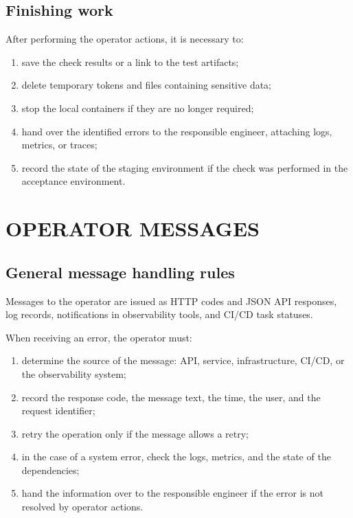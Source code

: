 \documentclass[12pt,a4paper]{extarticle}
\begin{document}
\subsection{Finishing work}

\begin{hseExample}
After performing the operator actions, it is necessary to:

\begin{enumerate}[label=\arabic*), leftmargin=1.25cm]
    \item save the check results or a link to the test artifacts;
    \item delete temporary tokens and files containing sensitive data;
    \item stop the local containers if they are no longer required;
    \item hand over the identified errors to the responsible engineer, attaching logs, metrics, or traces;
    \item record the state of the staging environment if the check was performed in the acceptance environment.
\end{enumerate}
\end{hseExample}

\clearpage

\section{OPERATOR MESSAGES}

\subsection{General message handling rules}

\begin{hseExample}
Messages to the operator are issued as HTTP codes and JSON API responses, log records, notifications in observability tools, and CI/CD task statuses.

When receiving an error, the operator must:

\begin{enumerate}[label=\arabic*), leftmargin=1.25cm]
    \item determine the source of the message: API, service, infrastructure, CI/CD, or the observability system;
    \item record the response code, the message text, the time, the user, and the request identifier;
    \item retry the operation only if the message allows a retry;
    \item in the case of a system error, check the logs, metrics, and the state of the dependencies;
    \item hand the information over to the responsible engineer if the error is not resolved by operator actions.
\end{enumerate}
\end{hseExample}
\end{document}
